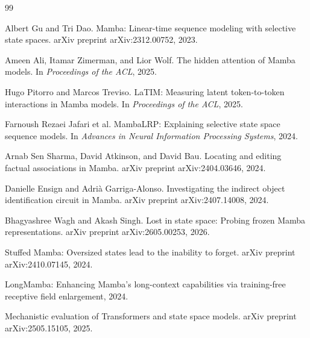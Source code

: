 \documentclass[11pt]{article}
\begin{document}
\begin{thebibliography}{99}

Albert Gu and Tri Dao.
Mamba: Linear-time sequence modeling with selective state spaces.
arXiv preprint arXiv:2312.00752, 2023.

Ameen Ali, Itamar Zimerman, and Lior Wolf.
The hidden attention of Mamba models.
In \emph{Proceedings of the ACL}, 2025.

Hugo Pitorro and Marcos Treviso.
LaTIM: Measuring latent token-to-token interactions in Mamba models.
In \emph{Proceedings of the ACL}, 2025.

Farnoush Rezaei Jafari et al.
MambaLRP: Explaining selective state space sequence models.
In \emph{Advances in Neural Information Processing Systems}, 2024.

Arnab Sen Sharma, David Atkinson, and David Bau.
Locating and editing factual associations in Mamba.
arXiv preprint arXiv:2404.03646, 2024.

Danielle Ensign and Adri{\`a} Garriga-Alonso.
Investigating the indirect object identification circuit in Mamba.
arXiv preprint arXiv:2407.14008, 2024.

Bhagyashree Wagh and Akash Singh.
Lost in state space: Probing frozen Mamba representations.
arXiv preprint arXiv:2605.00253, 2026.

Stuffed Mamba: Oversized states lead to the inability to forget.
arXiv preprint arXiv:2410.07145, 2024.

LongMamba: Enhancing Mamba's long-context capabilities via training-free
receptive field enlargement, 2024.

Mechanistic evaluation of Transformers and state space models.
arXiv preprint arXiv:2505.15105, 2025.

\end{thebibliography}
\end{document}
